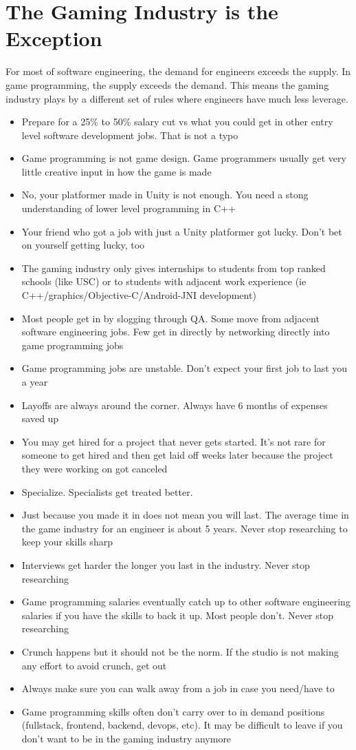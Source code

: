 \documentclass[12pt]{article}
\begin{document}
\section{The Gaming Industry is the Exception}
For most of software engineering, the demand for engineers exceeds the supply. In game programming, the supply exceeds the demand. This means the gaming industry plays by a different set of rules where engineers have much less leverage.
\begin{itemize}
\item Prepare for a 25\% to 50\% salary cut vs what you could get in other entry level software development jobs. That is not a typo
\item Game programming is not game design. Game programmers usually get very little creative input in how the game is made
\item No, your platformer made in Unity is not enough. You need a stong understanding of lower level programming in C++
\item Your friend who got a job with just a Unity platformer got lucky. Don't bet on yourself getting lucky, too
\item The gaming industry only gives internships to students from top ranked schools (like USC) or to students with adjacent work experience (ie C++/graphics/Objective-C/Android-JNI development)
\item Most people get in by slogging through QA. Some move from adjacent software engineering jobs. Few get in directly by networking directly into game programming jobs
\item Game programming jobs are unstable. Don't expect your first job to last you a year
\item Layoffs are always around the corner. Always have 6 months of expenses saved up
\item You may get hired for a project that never gets started. It's not rare for someone to get hired and then get laid off weeks later because the project they were working on got canceled
\item Specialize. Specialists get treated better.
\item Just because you made it in does not mean you will last. The average time in the game industry for an engineer is about 5 years. Never stop researching to keep your skills sharp
\item Interviews get harder the longer you last in the industry. Never stop researching
\item Game programming salaries eventually catch up to other software engineering salaries if you have the skills to back it up. Most people don't. Never stop researching
\item Crunch happens but it should not be the norm. If the studio is not making any effort to avoid crunch, get out 
\item Always make sure you can walk away from a job in case you need/have to
\item Game programming skills often don't carry over to in demand positions (fullstack, frontend, backend, devops, etc). It may be difficult to leave if you don't want to be in the gaming industry anymore
\end{itemize}
\end{document}
